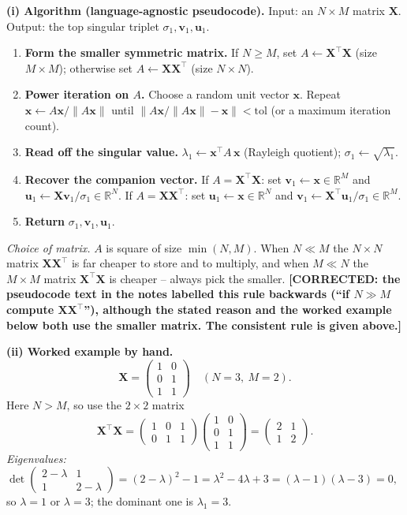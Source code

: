 \documentclass[12pt,a4paper]{article}
\newcommand{\fix}[1]{{\textbf{\textcolor{orange!85!black}{[CORRECTED: #1]}}}}
\theoremstyle{definition}
\newcommand{\R}{\mathbb{R}}
\newcommand{\Xb}{\mathbf{X}}
\newcommand{\vv}{\mathbf{v}}
\newcommand{\uu}{\mathbf{u}}
\newcommand{\xx}{\mathbf{x}}
\newcommand{\norm}[1]{\lVert #1 \rVert}
\newcommand{\T}{^{\!\top}}
\begin{document}
\textbf{(i) Algorithm (language-agnostic pseudocode).} Input: an
$N\times M$ matrix $\Xb$. Output: the top singular triplet
$\sigma_1,\vv_1,\uu_1$.
\begin{enumerate}[leftmargin=2.0em, itemsep=1pt, label=\arabic*.]
  \item \textbf{Form the smaller symmetric matrix.}
        If $N\ge M$, set $A\leftarrow\Xb\T\Xb$ (size $M\times M$);
        otherwise set $A\leftarrow\Xb\Xb\T$ (size $N\times N$).
  \item \textbf{Power iteration on $A$.} Choose a random unit vector $\xx$.
        Repeat $\xx\leftarrow A\xx/\norm{A\xx}$ until
        $\norm{A\xx/\norm{A\xx}-\xx}<\text{tol}$ (or a maximum iteration count).
  \item \textbf{Read off the singular value.}
        $\lambda_1\leftarrow \xx\T A\,\xx$ (Rayleigh quotient);
        $\sigma_1\leftarrow\sqrt{\lambda_1}$.
  \item \textbf{Recover the companion vector.}
        If $A=\Xb\T\Xb$: set $\vv_1\leftarrow\xx\in\R^{M}$ and
        $\uu_1\leftarrow \Xb\vv_1/\sigma_1\in\R^{N}$.
        If $A=\Xb\Xb\T$: set $\uu_1\leftarrow\xx\in\R^{N}$ and
        $\vv_1\leftarrow \Xb\T\uu_1/\sigma_1\in\R^{M}$.
  \item \textbf{Return} $\sigma_1,\vv_1,\uu_1$.
\end{enumerate}
\textit{Choice of matrix.} $A$ is square of size $\min(N,M)$. When $N\ll M$ the
$N\times N$ matrix $\Xb\Xb\T$ is far cheaper to store and to multiply, and when
$M\ll N$ the $M\times M$ matrix $\Xb\T\Xb$ is cheaper -- always pick the smaller.
\fix{the pseudocode text in the notes labelled this rule backwards (``if
$N\gg M$ compute $\Xb\Xb\T$''), although the stated reason and the worked
example below both use the smaller matrix. The consistent rule is given above.}

\textbf{(ii) Worked example by hand.}
\[
\Xb=\begin{pmatrix}1&0\\0&1\\1&1\end{pmatrix}\quad(N=3,\ M=2).
\]
Here $N>M$, so use the $2\times2$ matrix
\[
\Xb\T\Xb=\begin{pmatrix}1&0&1\\0&1&1\end{pmatrix}
\begin{pmatrix}1&0\\0&1\\1&1\end{pmatrix}
=\begin{pmatrix}2&1\\1&2\end{pmatrix}.
\]
\emph{Eigenvalues:}\quad
$\det\!\begin{pmatrix}2-\lambda&1\\1&2-\lambda\end{pmatrix}=(2-\lambda)^2-1
=\lambda^2-4\lambda+3=(\lambda-1)(\lambda-3)=0,$
so $\lambda=1$ or $\lambda=3$; the dominant one is $\lambda_1=3$.
\end{document}
